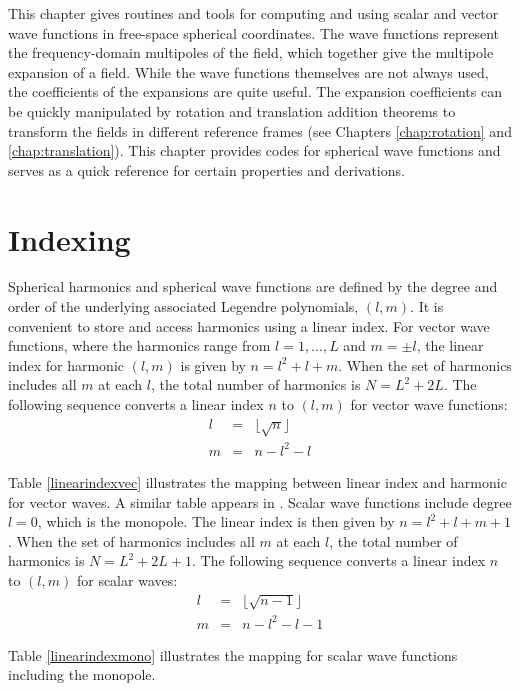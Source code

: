 

This chapter gives routines and tools for computing and using scalar and vector wave functions in free-space spherical coordinates. The wave functions represent the frequency-domain multipoles of the field, which together give the multipole expansion of a field. While the wave functions themselves are not always used, the coefficients of the expansions are quite useful. The expansion coefficients can be quickly manipulated by rotation and translation addition theorems to transform the fields in different reference frames (see Chapters \ref{chap:rotation} and \ref{chap:translation}). This chapter provides codes for spherical wave functions and serves as a quick reference for certain properties and derivations. 

\section{Indexing}

Spherical harmonics and spherical wave functions are defined by the degree and order of the underlying associated Legendre polynomials, $(l,m)$. It is convenient to store and access harmonics using a linear index. For vector wave functions, where the harmonics range from $l = 1,...,L$ and $m = \pm l$, the linear index for harmonic $(l,m)$ is given by $n = l^2 + l + m$. When the set of harmonics includes all $m$ at each $l$, the total number of harmonics is $N = L^2 + 2L$. The following sequence converts a linear index $n$ to $(l,m)$ for vector wave functions:
\begin{eqnarray}
l &=& \lfloor \sqrt{n} \rfloor \\
m &=& n - l^2 - l
\end{eqnarray}

Table \ref{linearindexvec} illustrates the mapping between linear index and harmonic for vector waves. A similar table appears in \cite{tsang2000scattering}.  Scalar wave functions include degree $l=0$, which is the monopole. The linear index is then given by $n = l^2 + l + m + 1$.  When the set of harmonics includes all $m$ at each $l$, the total number of harmonics is $N = L^2 + 2L + 1$.  The following sequence converts a linear index $n$ to $(l,m)$ for scalar waves:
\begin{eqnarray}
l &=& \lfloor \sqrt{n-1} \rfloor \\
m &=& n - l^2 - l -1
\end{eqnarray}

Table \ref{linearindexmono} illustrates the mapping for scalar wave functions including the monopole.  



